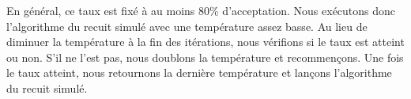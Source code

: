 \documentclass{article}
\begin{document}
En général, ce taux est fixé à au moins 80\% d'acceptation.
Nous exécutons donc l'algorithme du recuit simulé avec une température assez basse.
Au lieu de diminuer la température à la fin des itérations, nous vérifions si le taux est atteint ou non.
S'il ne l'est pas, nous doublons la température et recommençons.
Une fois le taux atteint, nous retournons la dernière température et lançons l'algorithme du recuit simulé.
\end{document}
